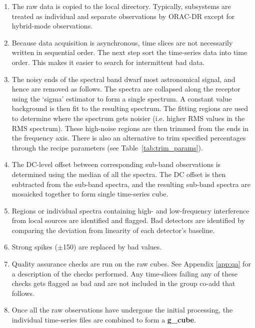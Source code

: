 \documentclass[11pt,oneside,chapters]{starlink}
\begin{document}
\begin{enumerate}[label=(\textbf{\arabic*})]

\item The raw data is copied to the local directory. Typically,
subsystems are treated as individual and separate observations by
ORAC-DR except for hybrid-mode observations.

\item Because data acquisition is asynchronous, time slices are not
necessarily written in sequential order. The next step sort the
time-series data into time order. This makes it easier to search for
intermittent bad data.

\item The noisy ends of the spectral band dwarf most
astronomical signal, and hence are removed as follows.
The spectra are collapsed along the receptor using the `sigma'
estimator to form a single spectrum. A constant value background is
then fit to the resulting spectrum. The fitting regions are used to
determine where the spectrum gets noisier (i.e. higher RMS values in
the RMS spectrum). These high-noise regions are then trimmed from the
ends in the frequency axis.   There is also an alternative to trim
specified percentages through the  recipe parameters
(see Table~\ref{tab:trim_params}).

\item The DC-level offset between corresponding sub-band observations
is determined using the median of all the spectra.  The DC offset is
then subtracted from the sub-band spectra, and the resulting sub-band
spectra are mosaicked together to form single time-series cube.

\item Regions or individual spectra containing high- and low-frequency
interference from local sources are identified and flagged.  Bad
detectors are identified by comparing the deviation from linearity of
each detector's baseline.

\item Strong spikes ($\pm$150) are replaced by bad values.

\item Quality assurance checks are run on the raw cubes. See Appendix
\ref{app:qa} for a description of the checks performed. Any
time-slices failing any of these checks gets flagged as bad and
are not included in the group co-add that follows.

\item Once all the raw observations have undergone the initial
processing, the individual time-series files are combined to form a
\textbf{g\_cube}.


\end{enumerate}
\end{document}
